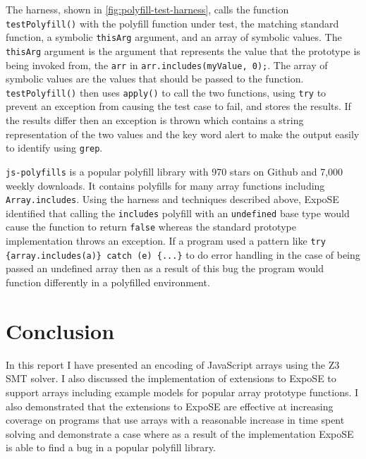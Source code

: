 \documentclass[]{final_report}
\begin{document}
The harness, shown in \ref{fig:polyfill-test-harness}, calls the function \lstinline|testPolyfill()| with the polyfill function under test, the matching standard function, a symbolic \lstinline|thisArg| argument, and an array of symbolic values. The \lstinline|thisArg| argument is the argument that represents the value that the prototype is being invoked from, the \lstinline|arr| in \lstinline|arr.includes(myValue, 0);|. The array of symbolic values are the values that should be passed to the function. \lstinline|testPolyfill()| then uses \lstinline|apply()| to call the two functions, using \lstinline|try| to prevent an exception from causing the test case to fail, and stores the results. If the results differ then an exception is thrown which contains a string representation of the two values and the key word alert to make the output easily to identify using \lstinline|grep|.

\lstinline|js-polyfills| is a popular polyfill library with 970 stars on Github and 7,000 weekly downloads. It contains polyfills for many array functions including \lstinline|Array.includes|. Using the harness and techniques described above, ExpoSE identified that calling the \lstinline|includes| polyfill with an \lstinline|undefined| base type would cause the function to return \lstinline|false| whereas the standard prototype implementation throws an exception. If a program used a pattern like \lstinline|try {array.includes(a)} catch (e) {...}| to do error handling in the case of being passed an undefined array then as a result of this bug the program would function differently in a polyfilled environment.

\chapter{Conclusion}
In this report I have presented an encoding of JavaScript arrays using the Z3 SMT solver. I also discussed the implementation of extensions to ExpoSE to support arrays including example models for popular array prototype functions. I also demonstrated that the extensions to ExpoSE are effective at increasing coverage on programs that use arrays with a reasonable increase in time spent solving and demonstrate a case where as a result of the implementation ExpoSE is able to find a bug in a popular polyfill library.
\end{document}

